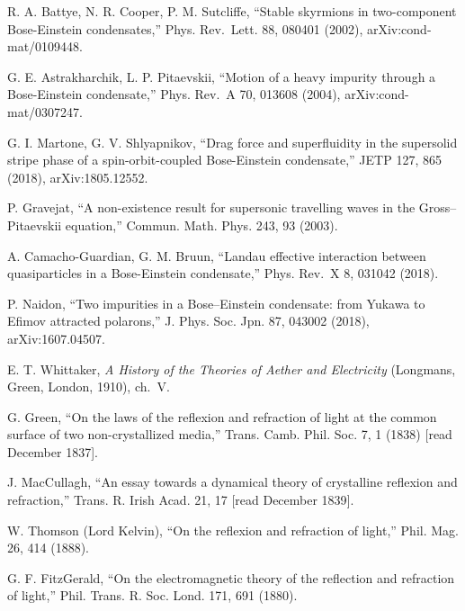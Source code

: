 \documentclass[
  11pt,
]{article}
\begin{document}
\begin{list}{}{\setlength{\leftmargin}{2.5em}\setlength{\labelwidth}{2.2em}\setlength{\labelsep}{0.3em}\setlength{\itemsep}{1pt}\setlength{\parsep}{0pt}\setlength{\topsep}{2pt}}
\item[{[46]}] R. A. Battye, N. R. Cooper, P. M. Sutcliffe, ``Stable
skyrmions in two-component Bose-Einstein condensates,'' Phys. Rev.~Lett.
88, 080401 (2002), arXiv:cond-mat/0109448.

\item[{[47]}] G. E. Astrakharchik, L. P. Pitaevskii, ``Motion of a heavy
impurity through a Bose-Einstein condensate,'' Phys. Rev.~A 70, 013608
(2004), arXiv:cond-mat/0307247.

\item[{[48]}] G. I. Martone, G. V. Shlyapnikov, ``Drag force and
superfluidity in the supersolid stripe phase of a spin-orbit-coupled
Bose-Einstein condensate,'' JETP 127, 865 (2018), arXiv:1805.12552.

\item[{[49]}] P. Gravejat, ``A non-existence result for supersonic
travelling waves in the Gross--Pitaevskii equation,'' Commun. Math.
Phys. 243, 93 (2003).

\item[{[50]}] A. Camacho-Guardian, G. M. Bruun, ``Landau effective
interaction between quasiparticles in a Bose-Einstein condensate,''
Phys. Rev.~X 8, 031042 (2018).

\item[{[51]}] P. Naidon, ``Two impurities in a Bose--Einstein
condensate: from Yukawa to Efimov attracted polarons,'' J. Phys. Soc.
Jpn. 87, 043002 (2018), arXiv:1607.04507.

\item[{[52]}] E. T. Whittaker, \emph{A History of the Theories of Aether
and Electricity} (Longmans, Green, London, 1910), ch.~V.

\item[{[53]}] G. Green, ``On the laws of the reflexion and refraction of
light at the common surface of two non-crystallized media,'' Trans.
Camb. Phil. Soc. 7, 1 (1838) {[}read December 1837{]}.

\item[{[54]}] J. MacCullagh, ``An essay towards a dynamical theory of
crystalline reflexion and refraction,'' Trans. R. Irish Acad. 21, 17
{[}read December 1839{]}.

\item[{[55]}] W. Thomson (Lord Kelvin), ``On the reflexion and
refraction of light,'' Phil. Mag. 26, 414 (1888).

\item[{[56]}] G. F. FitzGerald, ``On the electromagnetic theory of the
reflection and refraction of light,'' Phil. Trans. R. Soc. Lond. 171,
691 (1880).


\end{list}
\end{document}
